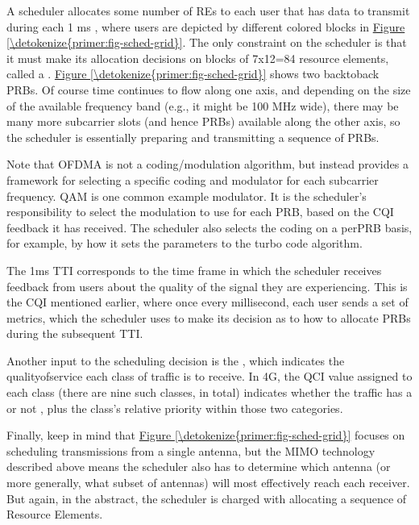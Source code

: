 \documentclass[a4paper,11pt,english]{sphinxmanual}
\begin{document}
\sphinxAtStartPar
A scheduler allocates some number of REs to each user that has data to
transmit during each 1 ms , where users
are depicted by different colored blocks in \hyperref[\detokenize{primer:fig-sched-grid}]{Figure \ref{\detokenize{primer:fig-sched-grid}}}.
The only constraint on the scheduler is that it must make its allocation
decisions on blocks of 7x12=84 resource elements, called a . \hyperref[\detokenize{primer:fig-sched-grid}]{Figure \ref{\detokenize{primer:fig-sched-grid}}} shows two
back\sphinxhyphen{}to\sphinxhyphen{}back PRBs. Of course time continues to flow along one axis, and
depending on the size of the available frequency band (e.g., it might be
100 MHz wide), there may be many more subcarrier slots (and hence PRBs)
available along the other axis, so the scheduler is essentially
preparing and transmitting a sequence of PRBs.

\sphinxAtStartPar
Note that OFDMA is not a coding/modulation algorithm, but instead
provides a framework for selecting a specific coding and modulator for
each subcarrier frequency. QAM is one common example modulator. It is
the scheduler’s responsibility to select the modulation to use for each
PRB, based on the CQI feedback it has received. The scheduler also
selects the coding on a per\sphinxhyphen{}PRB basis, for example, by how it sets the
parameters to the turbo code algorithm.

\sphinxAtStartPar
The 1\sphinxhyphen{}ms TTI corresponds to the time frame in which the scheduler
receives feedback from users about the quality of the signal they are
experiencing. This is the CQI mentioned earlier, where once every
millisecond, each user sends a set of metrics, which the scheduler uses
to make its decision as to how to allocate PRBs during the subsequent
TTI.

\sphinxAtStartPar
Another input to the scheduling decision is the , which indicates the quality\sphinxhyphen{}of\sphinxhyphen{}service each class of traffic is
to receive. In 4G, the QCI value assigned to each class (there are nine
such classes, in total) indicates whether the traffic has a  or not , plus the class’s relative priority
within those two categories.

\sphinxAtStartPar
Finally, keep in mind that \hyperref[\detokenize{primer:fig-sched-grid}]{Figure \ref{\detokenize{primer:fig-sched-grid}}} focuses on
scheduling transmissions from a single antenna, but the MIMO technology
described above means the scheduler also has to determine which antenna
(or more generally, what subset of antennas) will most effectively reach
each receiver. But again, in the abstract, the scheduler is charged with
allocating a sequence of Resource Elements.
\end{document}
